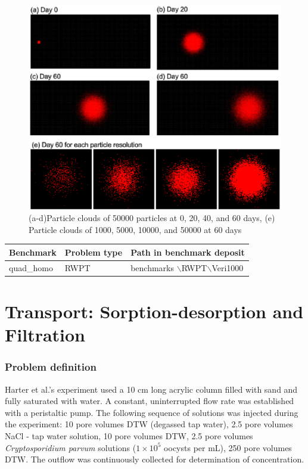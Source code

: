 \begin{figure}[h]
\centering
\includegraphics[scale=0.60]{RWPT/figures/ParticleClouds.eps}
\caption{(a-d)Particle clouds of 50000 particles at 0, 20, 40, and 60 days, (e) Particle clouds of 1000, 5000, 10000, and 50000 at 60 days}
\label{ParticleClouds}
\end{figure}

\begin{tabular}{|l|l|l|}
\hline
Benchmark & Problem type	& Path in benchmark deposit \\
\hline	
quad\_homo	& RWPT	& benchmarks $\backslash$RWPT$\backslash$Veri1000 \\
\hline	
\end{tabular}



\section{Transport: Sorption-desorption and Filtration}

\subsubsection*{Problem definition}
%
Harter et al.\textquoteright s experiment \cite{HarWag:2000} used a 10 cm long acrylic column filled with sand and fully saturated with water. A constant, uninterrupted flow rate was established with a peristaltic pump. The following sequence of solutions was injected during the experiment: 10 pore volumes DTW (degassed tap water), 2.5 pore volumes NaCl - tap water solution, 10 pore volumes DTW, 2.5 pore volumes \emph{Cryptosporidium parvum} solutions ($1\times10^5$ oocysts per mL), 250 pore volumes DTW. The outflow was continuously collected for determination of concentration.

